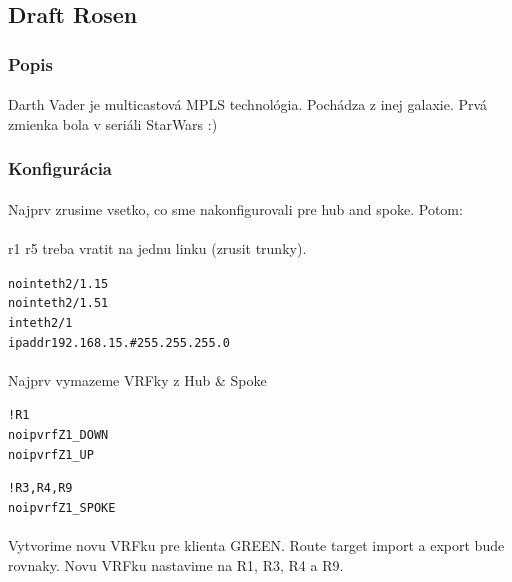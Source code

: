 \documentclass[12pt,twoside,a4paper]{report}
\begin{document}
\subsection{Draft Rosen}
\subsubsection{Popis}
\paragraph{}
Darth Vader je multicastová MPLS technológia. Pochádza z inej galaxie. Prvá zmienka bola v seriáli StarWars :)

\subsubsection{Konfigurácia}
\paragraph{}
Najprv zrusime vsetko, co sme nakonfigurovali pre hub and spoke. Potom:

\paragraph{}
r1 r5 treba vratit na jednu linku (zrusit trunky). 
\noindent
{\selectfont
\begin{small}
\begin{alltt}
no int eth2/1.15
no int eth2/1.51
int eth2/1
ip addr 192.168.15.# 255.255.255.0
\end{alltt}
\end{small}
}



\paragraph{}
Najprv vymazeme VRFky z Hub \& Spoke
\noindent
{\selectfont
\begin{small}
\begin{alltt}
!R1
no ip vrf Z1_DOWN
no ip vrf Z1_UP

!R3, R4, R9
no ip vrf Z1_SPOKE
\end{alltt}
\end{small}
}

\paragraph{}
Vytvorime novu VRFku pre klienta GREEN. Route target import a export bude rovnaky. Novu VRFku nastavime na R1, R3, R4 a R9.
\end{document}

